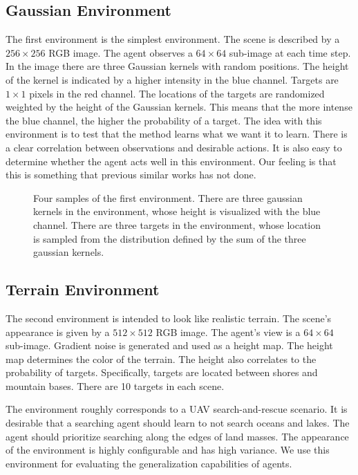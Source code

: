 \subsection{Gaussian Environment}

The first environment is the simplest environment. 
The scene is described by a \(256 \times 256\) RGB image.
The agent observes a \(64 \times 64\) sub-image at each time step.
In the image there are three Gaussian kernels with random positions.
The height of the kernel is indicated by a higher intensity in the blue channel.
Targets are \(1 \times 1\) pixels in the red channel.
The locations of the targets are randomized weighted by the height of the Gaussian kernels.
This means that the more intense the blue channel, the higher the probability of a target.
The idea with this environment is to test that the method learns what we want it to learn.
There is a clear correlation between observations and desirable actions.
It is also easy to determine whether the agent acts well in this environment.
Our feeling is that this is something that previous similar works has not done. %

\begin{figure}
    \centering
    
    \label{fig:gaussian}
    \caption[Gaussian environment]{Four samples of the first environment. There are three gaussian kernels in the environment, whose height is visualized with the blue channel. There are three targets in the environment, whose location is sampled from the distribution defined by the sum of the three gaussian kernels.}
\end{figure}

\subsection{Terrain Environment}

The second environment is intended to look like realistic terrain.
The scene's appearance is given by a \(512 \times 512\) RGB image.
The agent's view is a \(64 \times 64\) sub-image.
Gradient noise is generated and used as a height map.
The height map determines the color of the terrain.
The height also correlates to the probability of targets.
Specifically, targets are located between shores and mountain bases.
There are 10 targets in each scene.

The environment roughly corresponds to a UAV search-and-rescue scenario.
It is desirable that a searching agent should learn to not search oceans and lakes.
The agent should prioritize searching along the edges of land masses.
The appearance of the environment is highly configurable and has high variance.
We use this environment for evaluating the generalization capabilities of agents.

